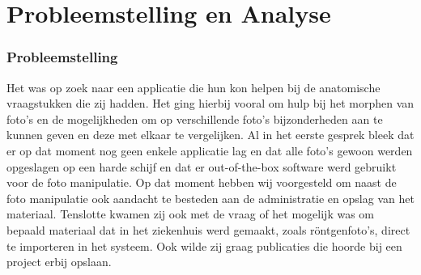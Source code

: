 \chapter{Probleemstelling en Analyse}
\label{Probleemstelling_en_analyse}
\subsection{Probleemstelling}
Het \casamproject was op zoek naar een applicatie die hun kon helpen bij de anatomische vraagstukken die zij hadden. 
Het ging hierbij vooral om hulp bij het morphen van foto's en de mogelijkheden om op verschillende foto's bijzonderheden aan te kunnen geven en deze met elkaar te vergelijken. 
Al in het eerste gesprek bleek dat er op dat moment nog geen enkele applicatie lag en dat alle foto's gewoon werden opgeslagen op een harde schijf en dat er out-of-the-box software werd gebruikt voor de foto manipulatie. 
Op dat moment hebben wij voorgesteld om naast de foto manipulatie ook aandacht te besteden aan de administratie en opslag van het materiaal.
Tenslotte kwamen zij ook met de vraag of het mogelijk was om bepaald materiaal dat in het ziekenhuis werd gemaakt, zoals r\"{o}ntgenfoto's, direct te importeren in het systeem. Ook wilde zij graag publicaties die hoorde bij een project erbij opslaan.

